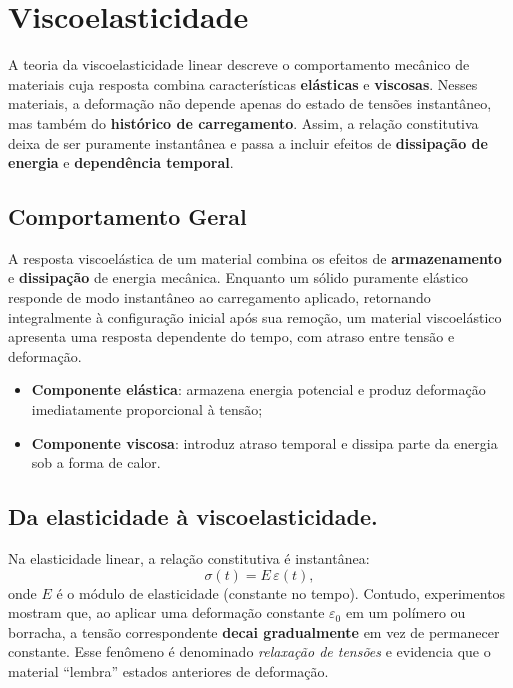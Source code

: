 \chapter{Viscoelasticidade}\label{Int}

A teoria da viscoelasticidade linear descreve o comportamento mecânico de materiais cuja resposta combina características \textbf{elásticas} e \textbf{viscosas}. Nesses materiais, a deformação não depende apenas do estado de tensões instantâneo, mas também do \textbf{histórico de carregamento}. Assim, a relação constitutiva deixa de ser puramente instantânea e passa a incluir efeitos de \textbf{dissipação de energia} e \textbf{dependência temporal}.

\section{Comportamento Geral}

A resposta viscoelástica de um material combina os efeitos de \textbf{armazenamento} e \textbf{dissipação} de energia mecânica.  
Enquanto um sólido puramente elástico responde de modo instantâneo ao carregamento aplicado, retornando integralmente à configuração inicial após sua remoção, um material viscoelástico apresenta uma resposta dependente do tempo, com atraso entre tensão e deformação.

\begin{itemize}
    \item \textbf{Componente elástica}: armazena energia potencial e produz deformação imediatamente proporcional à tensão;
    \item \textbf{Componente viscosa}: introduz atraso temporal e dissipa parte da energia sob a forma de calor.
\end{itemize}

\section{Da elasticidade à viscoelasticidade.}
Na elasticidade linear, a relação constitutiva é instantânea:
\begin{equation}
    \sigma(t) = E\,\varepsilon(t),
    \label{eq:hooke_elastica}
\end{equation}
onde $E$ é o módulo de elasticidade (constante no tempo).  
Contudo, experimentos mostram que, ao aplicar uma deformação constante $\varepsilon_0$ em um polímero ou borracha, a tensão correspondente \textbf{decai gradualmente} em vez de permanecer constante.  
Esse fenômeno é denominado \textit{relaxação de tensões} e evidencia que o material “lembra” estados anteriores de deformação.

